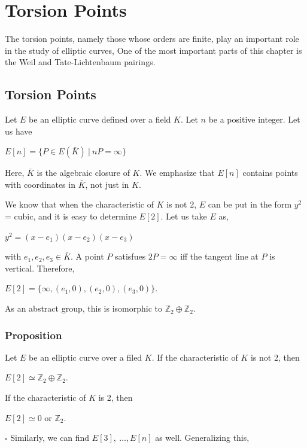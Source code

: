 \documentclass[a4paper, 12pt]{article}
\begin{document}
\section * {Torsion Points}
The torsion points, namely those whose orders are finite, play an important role in the study of elliptic curves, One of the most important parts of this chapter is the Weil and Tate-Lichtenbaum pairings. 
\subsection {Torsion Points}
Let $E$ be an elliptic curve defined over a field $K$. Let $n$ be a positive integer. Let us have
\begin{center}
$ E[n] = \{P \in E(\bar{K}) \: | \: nP = \infty\} $
\end{center}
Here, $\bar{K}$ is the algebraic closure of $K$. We emphasize that $E[n]$ contains points with coordinates in $\bar{K}$, not just in $K$. \par
We know that when the characteristic of $K$ is not 2, $E$ can be put in the form $y^2$ = cubic, and it is easy to determine $E[2]$. Let us take $E$ as,
\begin{center} $y^2 = (x-e_1)(x-e_2)(x-e_3)$ \end{center}
with $e_1,e_2,e_3 \in \bar{K}$. A point $P$ satisfues $2P = \infty$ iff the tangent line at $P$ is vertical. Therefore,
\begin{center} $E[2] = \{\infty, (e_1,0), (e_2,0), (e_3,0) \} $. \end{center}
As an abstract group, this is isomorphic to $\mathbb{Z}_2 \oplus \mathbb{Z}_2$.
\subsubsection {Proposition}
Let $E$ be an elliptic curve over a filed $K$. If the characteristic of $K$ is not 2, then
\begin{center} $E[2] \simeq \mathbb{Z}_2 \oplus \mathbb{Z}_2$. \end{center}
If the characteristic of $K$ is 2, then
\begin{center} $E[2] \simeq 0$ or $\mathbb{Z}_2.$ \end{center} $\square$ \newline
Similarly, we can find $E[3],\: \dotso, E[n]$ as well. Generalizing this, 
\end{document}
